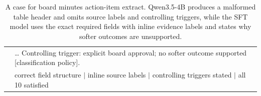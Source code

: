 \begin{table}[t]
\begin{tabular}{p{2.2cm} p{12.8cm}}
& \ldots{} Controlling trigger: explicit board approval; no softer outcome supported [classification policy]. \\
& \colorbox{green!10}{\small\textsf{correct field structure $\mid$ inline source labels $\mid$ controlling triggers stated $\mid$ all 10 satisfied}} \\
\bottomrule
\end{tabular}
\caption{A case for board minutes action-item extract. Qwen3.5-4B produces a malformed table header and omits source labels and controlling triggers, while the SFT model uses the exact required fields with inline evidence labels and states why softer outcomes are unsupported.}
\label{tab:sft-case-3}
\end{table}
